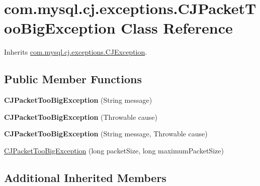 \hypertarget{classcom_1_1mysql_1_1cj_1_1exceptions_1_1_c_j_packet_too_big_exception}{}\section{com.\+mysql.\+cj.\+exceptions.\+C\+J\+Packet\+Too\+Big\+Exception Class Reference}
\label{classcom_1_1mysql_1_1cj_1_1exceptions_1_1_c_j_packet_too_big_exception}


Inherits \mbox{\hyperlink{classcom_1_1mysql_1_1cj_1_1exceptions_1_1_c_j_exception}{com.\+mysql.\+cj.\+exceptions.\+C\+J\+Exception}}.

\subsection*{Public Member Functions}
\begin{DoxyCompactItemize}
\item 
\mbox{\label{classcom_1_1mysql_1_1cj_1_1exceptions_1_1_c_j_packet_too_big_exception_afa8186c5a545288a9025379a016c198b}} 
{\bfseries C\+J\+Packet\+Too\+Big\+Exception} (String message)
\item 
\mbox{\label{classcom_1_1mysql_1_1cj_1_1exceptions_1_1_c_j_packet_too_big_exception_a6c999dc0b91b9e456ce5b33d634ecd7b}} 
{\bfseries C\+J\+Packet\+Too\+Big\+Exception} (Throwable cause)
\item 
\mbox{\label{classcom_1_1mysql_1_1cj_1_1exceptions_1_1_c_j_packet_too_big_exception_a825290fd8f75cca59f80b124464fb699}} 
{\bfseries C\+J\+Packet\+Too\+Big\+Exception} (String message, Throwable cause)
\item 
\mbox{\hyperlink{classcom_1_1mysql_1_1cj_1_1exceptions_1_1_c_j_packet_too_big_exception_a2b7bde7117634bc639116d3977645c78}{C\+J\+Packet\+Too\+Big\+Exception}} (long packet\+Size, long maximum\+Packet\+Size)
\end{DoxyCompactItemize}
\subsection*{Additional Inherited Members}


